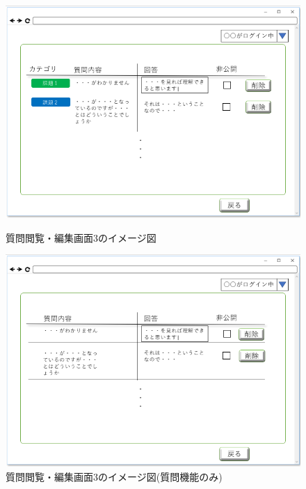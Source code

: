 \begin{figure}[htbp]
 \begin{minipage}{0.5\hsize}
  \begin{center}
   \includegraphics[width=1\linewidth,clip]{./img/19.png}
  \end{center}
  \caption{質問閲覧・編集画面3のイメージ図　　　　　　　}\label{fig:19}
 \end{minipage}
 \begin{minipage}{0.5\hsize}
  \begin{center}
   \includegraphics[width=1\linewidth,clip]{./img/000.png}
  \end{center}
  \caption{質問閲覧・編集画面3のイメージ図(質問機能のみ)}\label{fig:000}
 \end{minipage}
\end{figure}

